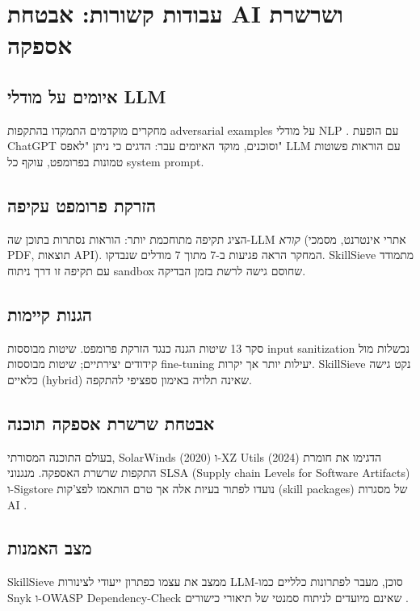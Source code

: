 
\clearpage
\chapter{עבודות קשורות: אבטחת \textenglish{AI} ושרשרת אספקה}

\section{איומים על מודלי \textenglish{LLM}}

מחקרים מוקדמים התמקדו בהתקפות \textenglish{adversarial examples} על מודלי \textenglish{NLP} . עם הופעת \textenglish{ChatGPT} וסוכנים, מוקד האיומים עבר: \cite{perez2022ignore} הדגים כי ניתן "לאפס" \textenglish{LLM} עם הוראות פשוטות טמונות בפרומפט, עוקף כל \textenglish{system prompt}.

\section{הזרקת פרומפט עקיפה}

\cite{greshake2023indirect} הציג תקיפה מתוחכמת יותר: הוראות נסתרות בתוכן שה-\textenglish{LLM} \textit{קורא} (אתרי אינטרנט, מסמכי \textenglish{PDF}, תוצאות \textenglish{API}). המחקר הראה פגיעות ב-\textenglish{7} מתוך \textenglish{7} מודלים שנבדקו. \textenglish{SkillSieve} מתמודד עם תקיפה זו דרך ניתוח \textenglish{sandbox} שחוסם גישה לרשת בזמן הבדיקה.

\section{הגנות קיימות}

\cite{liu2023prompt} סקר \textenglish{13} שיטות הגנה כנגד הזרקת פרומפט. שיטות מבוססות \textenglish{input sanitization} נכשלות מול קידודים יצירתיים; שיטות מבוססות \textenglish{fine-tuning} יעילות יותר אך יקרות. \textenglish{SkillSieve} נקט גישה כלאיים (\textenglish{hybrid}) שאינה תלויה באימון ספציפי להתקפה.

\section{אבטחת שרשרת אספקה תוכנה}

בעולם התוכנה המסורתי, \textenglish{SolarWinds} (2020) ו-\textenglish{XZ Utils} (2024) הדגימו את חומרת התקפות שרשרת האספקה. מנגנוני \textenglish{SLSA} (\textenglish{Supply chain Levels for Software Artifacts}) ו-\textenglish{Sigstore} נועדו לפתור בעיות אלה אך טרם הותאמו לפצ'קות (\textenglish{skill packages}) של מסגרות \textenglish{AI} \cite{weidinger2021ethical}.

\section{מצב האמנות}

\textenglish{SkillSieve} ממצב את עצמו כפתרון ייעודי לצינורות \textenglish{LLM}-סוכן, מעבר לפתרונות כלליים כמו \textenglish{Snyk} ו-\textenglish{OWASP Dependency-Check} שאינם מיועדים לניתוח סמנטי של תיאורי כישורים \cite{nakash2024skillsieve}.
